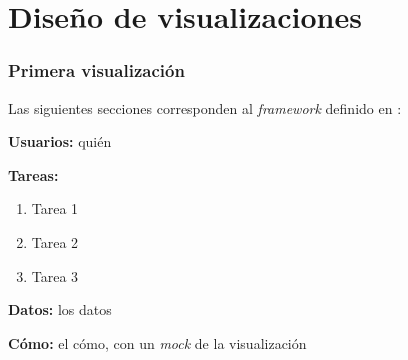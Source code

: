 \section{Diseño de visualizaciones}
\label{section:diseño-viz}

\subsubsection{Primera visualización}
Las siguientes secciones corresponden al \textit{framework} definido en \cite{munzner2014}:

\textbf{Usuarios:} quién

\textbf{Tareas:}
\begin{enumerate}
	\item Tarea 1
	\item Tarea 2
	\item Tarea 3
\end{enumerate}

\textbf{Datos:} los datos

\textbf{Cómo:} el cómo, con un \textit{mock} de la visualización
